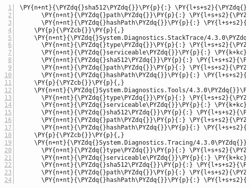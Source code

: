 \begin{Verbatim}[commandchars=\\\{\},numbers=left,firstnumber=1,stepnumber=1,numberblanklines=0]
      \PY{n+nt}{\PYZdq{}sha512\PYZdq{}}\PY{p}{:} \PY{l+s+s2}{\PYZdq{}sha512\PYZhy{}omCF64wzQ3Q2CeIqkD6lmmxeMZtGHUmzgFMPjfVaOsyqpR66p/JaZzManMw1s33osoAb5gqpncsjie67+yUPHQ==\PYZdq{}}\PY{p}{,}
      \PY{n+nt}{\PYZdq{}path\PYZdq{}}\PY{p}{:} \PY{l+s+s2}{\PYZdq{}system.diagnostics.fileversioninfo/4.3.0\PYZdq{}}\PY{p}{,}
      \PY{n+nt}{\PYZdq{}hashPath\PYZdq{}}\PY{p}{:} \PY{l+s+s2}{\PYZdq{}system.diagnostics.fileversioninfo.4.3.0.nupkg.sha512\PYZdq{}}
    \PY{p}{\PYZcb{}}\PY{p}{,}
    \PY{n+nt}{\PYZdq{}System.Diagnostics.StackTrace/4.3.0\PYZdq{}}\PY{p}{:} \PY{p}{\PYZob{}}
      \PY{n+nt}{\PYZdq{}type\PYZdq{}}\PY{p}{:} \PY{l+s+s2}{\PYZdq{}package\PYZdq{}}\PY{p}{,}
      \PY{n+nt}{\PYZdq{}serviceable\PYZdq{}}\PY{p}{:} \PY{k+kc}{true}\PY{p}{,}
      \PY{n+nt}{\PYZdq{}sha512\PYZdq{}}\PY{p}{:} \PY{l+s+s2}{\PYZdq{}sha512\PYZhy{}BiHg0vgtd35/DM9jvtaC1eKRpWZxr0gcQd643ABG7GnvSlf5pOkY2uyd42mMOJoOmKvnpNj0F4tuoS1pacTwYw==\PYZdq{}}\PY{p}{,}
      \PY{n+nt}{\PYZdq{}path\PYZdq{}}\PY{p}{:} \PY{l+s+s2}{\PYZdq{}system.diagnostics.stacktrace/4.3.0\PYZdq{}}\PY{p}{,}
      \PY{n+nt}{\PYZdq{}hashPath\PYZdq{}}\PY{p}{:} \PY{l+s+s2}{\PYZdq{}system.diagnostics.stacktrace.4.3.0.nupkg.sha512\PYZdq{}}
    \PY{p}{\PYZcb{}}\PY{p}{,}
    \PY{n+nt}{\PYZdq{}System.Diagnostics.Tools/4.3.0\PYZdq{}}\PY{p}{:} \PY{p}{\PYZob{}}
      \PY{n+nt}{\PYZdq{}type\PYZdq{}}\PY{p}{:} \PY{l+s+s2}{\PYZdq{}package\PYZdq{}}\PY{p}{,}
      \PY{n+nt}{\PYZdq{}serviceable\PYZdq{}}\PY{p}{:} \PY{k+kc}{true}\PY{p}{,}
      \PY{n+nt}{\PYZdq{}sha512\PYZdq{}}\PY{p}{:} \PY{l+s+s2}{\PYZdq{}sha512\PYZhy{}UUvkJfSYJMM6x527dJg2VyWPSRqIVB0Z7dbjHst1zmwTXz5CcXSYJFWRpuigfbO1Lf7yfZiIaEUesfnl/g5EyA==\PYZdq{}}\PY{p}{,}
      \PY{n+nt}{\PYZdq{}path\PYZdq{}}\PY{p}{:} \PY{l+s+s2}{\PYZdq{}system.diagnostics.tools/4.3.0\PYZdq{}}\PY{p}{,}
      \PY{n+nt}{\PYZdq{}hashPath\PYZdq{}}\PY{p}{:} \PY{l+s+s2}{\PYZdq{}system.diagnostics.tools.4.3.0.nupkg.sha512\PYZdq{}}
    \PY{p}{\PYZcb{}}\PY{p}{,}
    \PY{n+nt}{\PYZdq{}System.Diagnostics.Tracing/4.3.0\PYZdq{}}\PY{p}{:} \PY{p}{\PYZob{}}
      \PY{n+nt}{\PYZdq{}type\PYZdq{}}\PY{p}{:} \PY{l+s+s2}{\PYZdq{}package\PYZdq{}}\PY{p}{,}
      \PY{n+nt}{\PYZdq{}serviceable\PYZdq{}}\PY{p}{:} \PY{k+kc}{true}\PY{p}{,}
      \PY{n+nt}{\PYZdq{}sha512\PYZdq{}}\PY{p}{:} \PY{l+s+s2}{\PYZdq{}sha512\PYZhy{}rswfv0f/Cqkh78rA5S8eN8Neocz234+emGCtTF3lxPY96F+mmmUen6tbn0glN6PMvlKQb9bPAY5e9u7fgPTkKw==\PYZdq{}}\PY{p}{,}
      \PY{n+nt}{\PYZdq{}path\PYZdq{}}\PY{p}{:} \PY{l+s+s2}{\PYZdq{}system.diagnostics.tracing/4.3.0\PYZdq{}}\PY{p}{,}
      \PY{n+nt}{\PYZdq{}hashPath\PYZdq{}}\PY{p}{:} \PY{l+s+s2}{\PYZdq{}system.diagnostics.tracing.4.3.0.nupkg.sha512\PYZdq{}}

\end{Verbatim}
